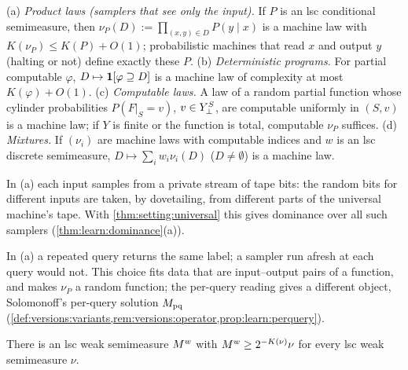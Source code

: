 \begin{proposition}\label{prop:setting:includes}
(a) \emph{Product laws (samplers that see only the input).} If $P$ is an lsc conditional semimeasure, then $\nu_P(D):=\prod_{(x,y)\in D}P(y\mid x)$ is a machine law with $K(\nu_P)\le K(P)+O(1)$; probabilistic machines that read $x$ and output $y$ (halting or not) define exactly these $P$.
(b) \emph{Deterministic programs.} For partial computable $\varphi$, $D\mapsto\mathbf{1}[\varphi\supseteq D]$ is a machine law of complexity at most $K(\varphi)+O(1)$.
(c) \emph{Computable laws.} A law of a random partial function whose cylinder probabilities $P(F|_S=v)$, $v\in Y_{\bot}^S$, are computable uniformly in $(S,v)$ is a machine law; if $Y$ is finite or the function is total, computable $\nu_P$ suffices.
(d) \emph{Mixtures.} If $(\nu_i)$ are machine laws with computable indices and $w$ is an lsc discrete semimeasure, $D\mapsto\sum_iw_i\nu_i(D)$ ($D\ne\emptyset$) is a machine law.
\end{proposition}

In (a) each input samples from a private stream of tape bits: the random bits for different inputs are taken, by dovetailing, from different parts of the universal machine's tape. With \cref{thm:setting:universal} this gives dominance over all such samplers (\cref{thm:learn:dominance}(a)).

\begin{remark}\label{rem:setting:perinput}
In (a) a repeated query returns the same label; a sampler run afresh at each query would not. This choice fits data that are input--output pairs of a function, and makes $\nu_P$ a random function; the per-query reading gives a different object, Solomonoff's per-query solution $M_{\mathrm{pq}}$ (\cref{def:versions:variants,rem:versions:operator,prop:learn:perquery}).
\end{remark}

\begin{theorem}\label{thm:setting:weakuniversal}
There is an lsc weak semimeasure $M^{w}$ with $M^{w}\ge2^{-K(\nu)}\nu$ for every lsc weak semimeasure $\nu$.
\end{theorem}

